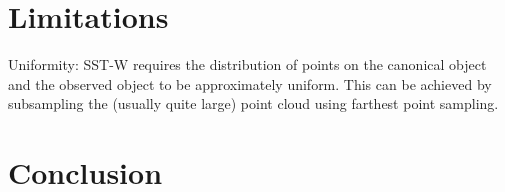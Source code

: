 \documentclass{article}
\newcommand{\ob}[1]{\textcolor{purple}{[\textbf{OB:} #1]}}
\begin{document}

\section{Limitations}

Uniformity: SST-W requires the distribution of points on the canonical object and the observed object to be approximately uniform. This can be achieved by subsampling the (usually quite large) point cloud using farthest point sampling.

\section{Conclusion}
\end{document}
